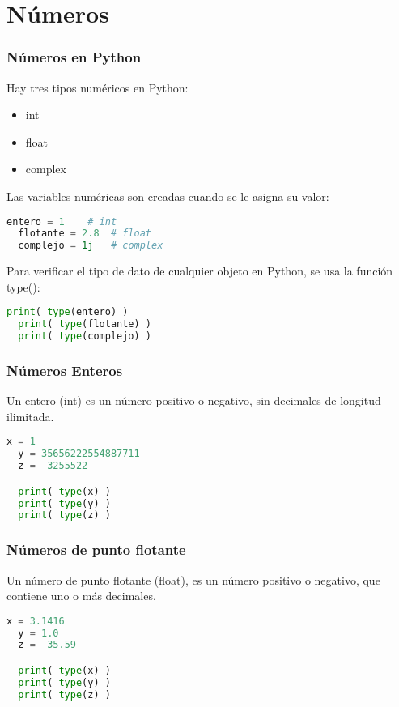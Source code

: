 \section{Números}

\begin{frame}[fragile]
  \frametitle{Números en Python}

  \vspace{\baselineskip}
  Hay tres tipos numéricos en Python:

  \begin{itemize}
    \item \textcolor{codeKeyword}{int}
    \item \textcolor{codeKeyword}{float}
    \item \textcolor{codeKeyword}{complex}
  \end{itemize}

  Las variables numéricas son creadas cuando se le asigna su valor:

  \begin{lstlisting}[language=Python]
  entero = 1    # int
  flotante = 2.8  # float
  complejo = 1j   # complex\end{lstlisting}

  \pausa
  Para verificar el tipo de dato de cualquier objeto en Python, se usa la
  función \textcolor{codeKeyword}{type}():

  \begin{lstlisting}[language=Python]
  print( type(entero) )
  print( type(flotante) )
  print( type(complejo) )\end{lstlisting}
\end{frame}

\begin{frame}[fragile]
  \frametitle{Números Enteros}

  Un entero (\textcolor{codeKeyword}{int}) es un número positivo o
  negativo, sin decimales de longitud ilimitada.

  \vspace{\baselineskip}
  \begin{lstlisting}[language=Python]
  x = 1
  y = 35656222554887711
  z = -3255522

  print( type(x) )
  print( type(y) )
  print( type(z) )
  \end{lstlisting}
\end{frame}

\begin{frame}[fragile]
  \frametitle{Números de punto flotante}

  Un número de punto flotante (\textcolor{codeKeyword}{float}), es un número
  positivo o negativo, que contiene uno o más decimales.

  \vspace{\baselineskip}
  \begin{lstlisting}[language=Python]
  x = 3.1416
  y = 1.0
  z = -35.59

  print( type(x) )
  print( type(y) )
  print( type(z) )
  \end{lstlisting}
\end{frame}

